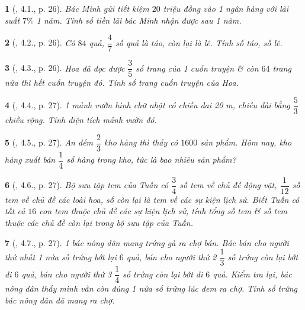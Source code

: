 \documentclass{article}
\newtheorem{baitoan}{}
\begin{document}
\begin{baitoan}[\cite{Binh_boi_duong_Toan_6_tap_2}, 4.1., p. 26]
	Bác Minh gửi tiết kiệm $20$ triệu đồng vào 1 ngân hàng với lãi suất $7\%$ 1 năm. Tính số tiền lãi bác Minh nhận được sau 1 năm.
\end{baitoan}

\begin{baitoan}[\cite{Binh_boi_duong_Toan_6_tap_2}, 4.2., p. 26]
	Có $84$ quả, $\dfrac{4}{7}$ số quả là táo, còn lại là lê. Tính số táo, số lê.
\end{baitoan}

\begin{baitoan}[\cite{Binh_boi_duong_Toan_6_tap_2}, 4.3., p. 26]
	Hoa đã đọc được $\dfrac{3}{5}$ số trang của 1 cuốn truyện \& còn $64$ trang nữa thì hết cuốn truyện đó. Tính số trang cuốn truyện của Hoa.
\end{baitoan}

\begin{baitoan}[\cite{Binh_boi_duong_Toan_6_tap_2}, 4.4., p. 27]
	1 mảnh vườn hình chữ nhật có chiều dai {\rm20 m}, chiều dài bằng $\dfrac{5}{3}$ chiều rộng. Tính diện tích mảnh vườn đó.
\end{baitoan}

\begin{baitoan}[\cite{Binh_boi_duong_Toan_6_tap_2}, 4.5., p. 27]
	An đếm $\dfrac{2}{3}$ kho hàng thì thấy có $1600$ sản phẩm. Hôm nay, kho hàng xuất bán $\dfrac{1}{4}$ số hàng trong kho, tức là bao nhiêu sản phẩm?
\end{baitoan}

\begin{baitoan}[\cite{Binh_boi_duong_Toan_6_tap_2}, 4.6., p. 27]
	Bộ sưu tập tem của Tuấn có $\dfrac{3}{4}$ số tem về chủ đề động vật, $\dfrac{1}{12}$ số tem về chủ đề các loài hoa, số còn lại là tem về các sự kiện lịch sử. Biết Tuấn có tất cả $16$ con tem thuộc chủ đề các sự kiện lịch sử, tính tổng số tem \& số tem thuộc các chủ đề còn lại trong bộ sưu tập của Tuấn.
\end{baitoan}

\begin{baitoan}[\cite{Binh_boi_duong_Toan_6_tap_2}, 4.7., p. 27]
	1 bác nông dân mang trứng gà ra chợ bán. Bác bán cho người thứ nhất 1 nửa số trứng bớt lại $6$ quả, bán cho người thứ 2 $\dfrac{1}{3}$ số trứng còn lại bớt đi $6$ quả, bán cho người thứ 3 $\dfrac{1}{4}$ số trứng còn lại bớt đi $6$ quả. Kiểm tra lại, bác nông dân thấy mình vẫn còn đúng 1 nửa số trứng lúc đem ra chợ. Tính số trứng bác nông dân đã mang ra chợ.
\end{baitoan}
\end{document}
